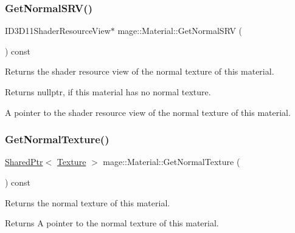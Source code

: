 \subsubsection{\texorpdfstring{Get\+Normal\+S\+R\+V()}{GetNormalSRV()}}
{\footnotesize\ttfamily I\+D3\+D11\+Shader\+Resource\+View$\ast$ mage\+::\+Material\+::\+Get\+Normal\+S\+RV (\begin{DoxyParamCaption}{ }\end{DoxyParamCaption}) const\hspace{0.3cm}{\ttfamily [noexcept]}}

Returns the shader resource view of the normal texture of this material.

\begin{DoxyReturn}{Returns}
{\ttfamily nullptr}, if this material has no normal texture. 

A pointer to the shader resource view of the normal texture of this material. 
\end{DoxyReturn}
\hypertarget{structmage_1_1_material_a7343766b10456e4ed1e09b3fe6110981}{}\label{structmage_1_1_material_a7343766b10456e4ed1e09b3fe6110981} 
\subsubsection{\texorpdfstring{Get\+Normal\+Texture()}{GetNormalTexture()}}
{\footnotesize\ttfamily \hyperlink{namespacemage_a1e01ae66713838a7a67d30e44c67703e}{Shared\+Ptr}$<$ \hyperlink{classmage_1_1_texture}{Texture} $>$ mage\+::\+Material\+::\+Get\+Normal\+Texture (\begin{DoxyParamCaption}{ }\end{DoxyParamCaption}) const\hspace{0.3cm}{\ttfamily [noexcept]}}

Returns the normal texture of this material.

\begin{DoxyReturn}{Returns}
A pointer to the normal texture of this material. 
\end{DoxyReturn}
\hypertarget{structmage_1_1_material_a48afb440024e4e2e45a81ce2b46c0d73}{}\label{structmage_1_1_material_a48afb440024e4e2e45a81ce2b46c0d73} 
